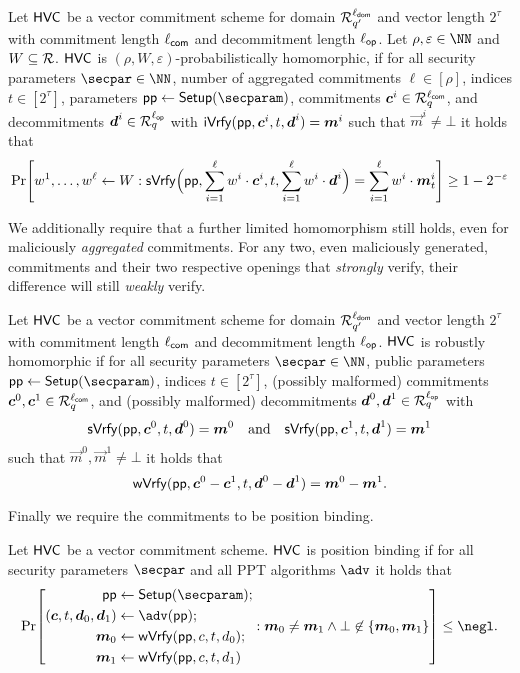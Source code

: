 \begin{definition}
Let $\mathsf{HVC}$ be a vector commitment scheme for domain $\mathcal{R}^{\ell_{\mathsf{dom}}}_{q'}$ and vector length $2^\tau$ with commitment length ${\ell_{\mathsf{com}}}$ and decommitment length ${\ell_{\mathsf{op}}}$.
Let $\rho,\varepsilon\in\NN$ and $W\subseteq\mathcal{R}$.
$\mathsf{HVC}$ is $(\rho,W,\varepsilon)$-probabilistically homomorphic, if for all security parameters $\secpar\in\NN$, number of aggregated commitments $\ell\in[\rho]$, indices $t\in[2^\tau]$, parameters $\params \gets \setup(\secparam)$, commitments $\boldsymbol{c}^i\in\mathcal{R}_q^{{\ell_{\mathsf{com}}}}$, and decommitments $\boldsymbol{d}^i\in\mathcal{R}_q^{{\ell_{\mathsf{op}}}}$ with $\mathsf{iVrfy}(\mathsf{pp},\boldsymbol{c}^i,t,\boldsymbol{d}^i) = \boldsymbol{m}^i$ such that $\vec{m}^i \neq \bot$ it holds that
  \[
    \Pr\mleft[
      w^1,\dots,w^{\ell} \gets W :
      \sverify\Bigl(\params,\sum_{i=1}^{\ell}w^i\cdot \vec{c}^i,t,\sum_{i=1}^{\ell}w^i\cdot \vec{d}^i\Bigr) = \sum_{i=1}^{\ell}w^i\cdot\vec{m}^i_{t}
    \mright] \geq 1-2^{-\varepsilon}
  \]
\end{definition}
%
We additionally require that a further limited homomorphism still holds, even for maliciously \emph{aggregated} commitments.
For any two, even maliciously generated, commitments and their two respective openings that \emph{strongly} verify, their difference will still \emph{weakly} verify.

\begin{definition}
  \label{def:malhomhvc}
  Let $\mathsf{HVC}$ be a vector commitment scheme for domain $\mathcal{R}^{\ell_{\mathsf{dom}}}_{q'}$ and vector length $2^\tau$ with commitment length ${\ell_{\mathsf{com}}}$ and decommitment length ${\ell_{\mathsf{op}}}$.
  $\mathsf{HVC}$ is robustly homomorphic if for all security parameters $\secpar\in\NN$, public parameters $\params\gets\setup(\secparam)$, indices $t\in[2^\tau]$, (possibly malformed) commitments $\boldsymbol{c}^0,\boldsymbol{c}^1 \in \mathcal{R}_q^{\ell_{\mathsf{com}}}$, and (possibly malformed) decommitments $\boldsymbol{d}^0,\boldsymbol{d}^1\in\mathcal{R}_q^{\ell_{\mathsf{op}}}$ with
  \[
    \mathsf{sVrfy}(\mathsf{pp},\boldsymbol{c}^0, t,\boldsymbol{d}^0)=\boldsymbol{m}^0 \quad \text{and} \quad \mathsf{sVrfy}(\mathsf{pp},\boldsymbol{c}^1, t,\boldsymbol{d}^1)=\boldsymbol{m}^1
  \]
  such that $\vec{m}^0,\vec{m}^1\neq \bot$ it holds that
  \[
    \mathsf{wVrfy}(\mathsf{pp},\boldsymbol{c}^0 - \boldsymbol{c}^1, t,\boldsymbol{d}^0 - \boldsymbol{d}^1)=\boldsymbol{m}^0 - \boldsymbol{m}^1.
  \]
\end{definition}
%
Finally we require the commitments to be position binding.
\begin{definition}
  Let $\mathsf{HVC}$ be a vector commitment scheme.
  $\mathsf{HVC}$ is position binding if for all security parameters $\secpar$ and all PPT algorithms $\adv$ it holds that
  \[
    \Pr\mleft[
      \begin{aligned}
      \params\gets{}&\setup(\secparam);\\
      (\vec{c},t,\vec{d}_0,\vec{d}_1) \gets{}& \adv(\params);\\
      \vec{m}_0 \gets{}& \wverify(\params,c,t,d_0);\\
      \vec{m}_1 \gets{}& \wverify(\params,c,t,d_1)
      \end{aligned}:
      \vec{m}_0\neq \vec{m}_1 \land \bot\not\in\{\vec{m}_0,\vec{m}_1\}
    \mright]\leq \negl.
  \]
\end{definition}


